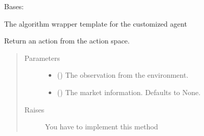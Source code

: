 \documentclass[letterpaper,10pt,english]{sphinxmanual}
\begin{document}
\begin{fulllineitems}
\label{\detokenize{Algorithm:crypto_env.algorithm.Algorithm}}
\sphinxAtStartPar
Bases: 

\sphinxAtStartPar
The algorithm wrapper template for the customized agent

\begin{fulllineitems}
\label{\detokenize{Algorithm:crypto_env.algorithm.Algorithm.take_action}}
\sphinxAtStartPar
Return an action from the action space.
\begin{quote}\begin{description}
\item[{Parameters}] \leavevmode\begin{itemize}
\item {} 
\sphinxAtStartPar
{} () \textendash{} The observation from the environment.

\item {} 
\sphinxAtStartPar
{} (\sphinxstyleliteralemphasis{\sphinxupquote{, }}) \textendash{} The market information. Defaults to None.

\end{itemize}

\item[{Raises}] \leavevmode
\sphinxAtStartPar
{} \textendash{} You have to implement this method

\end{description}\end{quote}

\end{fulllineitems}


\end{fulllineitems}
\end{document}

